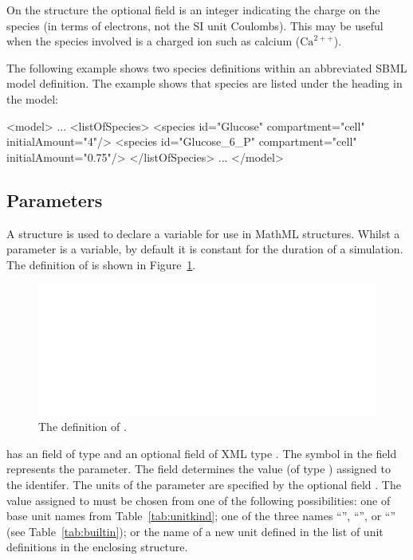 \documentclass[10pt]{cekarticle}
\newcommand{\vref}[1]{\ref{#1}}
\begin{document}
On the  structure the optional field  is an integer indicating the charge on the species (in terms of electrons, not the SI unit Coulombs). This may be useful when the species involved is a charged ion such as calcium ($\text{Ca}^{2++}$).

The following example shows two species definitions within an
abbreviated SBML model definition.  The example shows that species
are listed under the heading  in the model:

\begin{example}
<model>
    ...
    <listOfSpecies>
        <species id="Glucose" compartment="cell" initialAmount="4"/>
        <species id="Glucose_6_P" compartment="cell" initialAmount="0.75"/>
    </listOfSpecies>
    ...
</model>

\end{example}

\subsection{Parameters}
\label{sec:parameters}

A  structure is used to declare a variable for
use in MathML structures. Whilst a parameter is a variable, by
default it is constant for the duration of a simulation.  The
definition of  is shown in
Figure~\vref{fig:parameter}.

\begin{figure}[htb]
  \centering
  \includegraphics[scale = 0.68]{parameter}
  \caption{The definition of .}
  \label{fig:parameter}
\end{figure}

 has an  field of type  and
an optional  field of XML type . The
symbol in the  field represents the parameter.  The
field  determines the value (of type )
assigned to the identifer.  The units of the parameter
 are specified by the optional field .
The value assigned to  must be chosen from one of
the following possibilities: one of base unit names from
Table~\vref{tab:unitkind}; one of the three names
``'', ``'', or
``'' (see Table~\ref{tab:builtin}); or the name of
a new unit defined in the list of unit definitions in the
enclosing  structure.
\end{document}
